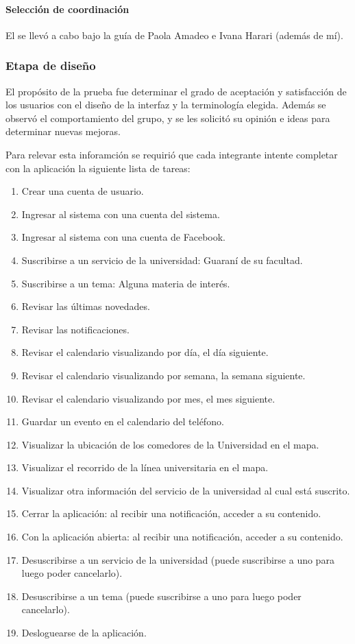 \paragraph{Selección de coordinación}
\label{desarrollo_pruebas_usabilidad_preparativos_coordinacion}

El  se llevó a cabo bajo la guía de Paola Amadeo e Ivana Harari (además de mí).

\subsubsection{Etapa de diseño}
\label{desarrollo_pruebas_usabilidad_diseno}

El propósito de la prueba fue determinar el grado de aceptación y satisfacción de los usuarios con el diseño de la interfaz y la terminología elegida. Además se observó el comportamiento del grupo, y se les solicitó su opinión e ideas para determinar nuevas mejoras. 

Para relevar esta inforamción se requirió que cada integrante intente completar con la aplicación la siguiente lista de tareas: 
\begin{enumerate}
\item Crear una cuenta de usuario.
\item Ingresar al sistema con una cuenta del sistema.
\item Ingresar al sistema con una cuenta de Facebook.
\item Suscribirse a un servicio de la universidad: Guaraní de su facultad.
\item Suscribirse a un tema: Alguna materia de interés.
\item Revisar las últimas novedades.
\item Revisar las notificaciones.
\item Revisar el calendario visualizando por día, el día siguiente.
\item Revisar el calendario visualizando por semana, la semana siguiente.
\item Revisar el calendario visualizando por mes, el mes siguiente.
\item Guardar un evento en el calendario del teléfono.
\item Visualizar la ubicación de los comedores de la Universidad en el mapa.
\item Visualizar el recorrido de la línea universitaria en el mapa.
\item Visualizar otra información del servicio de la universidad al cual está suscrito.
\item Cerrar la aplicación: al recibir una notificación, acceder a su contenido.
\item Con la aplicación abierta: al recibir una notificación, acceder a su contenido.
\item Desuscribirse a un servicio de la universidad (puede suscribirse a uno para luego poder cancelarlo).
\item Desuscribirse a un tema (puede suscribirse a uno para luego poder cancelarlo).
\item Desloguearse de la aplicación.
\end{enumerate}


